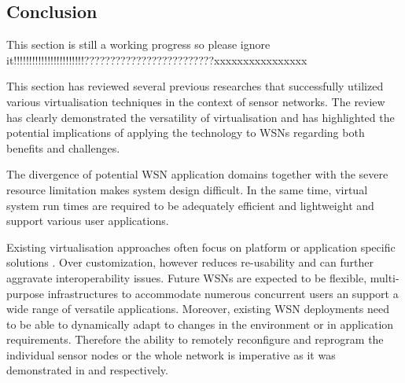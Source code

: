 \subsection{Conclusion}
This section is still a working progress so please ignore it!!!!!!!!!!!!!!!!!!!!!!!?????????????????????????xxxxxxxxxxxxxxxx

\bigskip
This section has reviewed several previous researches that successfully utilized various virtualisation techniques in the context of sensor networks. The review has clearly demonstrated the versatility of virtualisation and has highlighted the potential implications of applying the technology to WSNs regarding both benefits and challenges. 

The divergence of potential WSN application domains together with the severe resource limitation makes system design difficult. In the same time, virtual system run times are required to be adequately efficient and lightweight and support various user applications. 

Existing virtualisation approaches often focus on platform \cite{simon2005squawk} or application specific solutions \cite{levis2004bridging}. Over customization, however reduces re-usability and can further aggravate interoperability issues. Future WSNs are expected to be flexible, multi-purpose infrastructures to accommodate numerous concurrent users an support a wide range of versatile applications.  Moreover, existing WSN deployments need to be able to dynamically adapt to changes in the environment or in application requirements. Therefore the ability to remotely reconfigure and reprogram the individual sensor nodes or the whole network is imperative as it was demonstrated in \cite{koshy2005vmstar} and \cite{Michiels:2006:DDA:1176866.1176868} respectively. 

\begin{comment}
content...



The abstraction provided by virtualisation needs to be generic enough to simplify the integration of new functionality or components but in certain cases they have to be optimized to be efficient in specific domains.  

Virtualisation techniques at the different layers of the WSN infrastructure offer functionalities that are unique to the specific layer, however, they do not consider the other layers. 

The virtual machine approaches for example promote application portability and programming simplification, although the byte code interpretation mechanisms introduce computation overhead.

Based on the approaches that were reviewed in this section we identified a number of challenges that have not been fully addressed. This include the following areas:

i)
ii)
iii)

\end{comment}